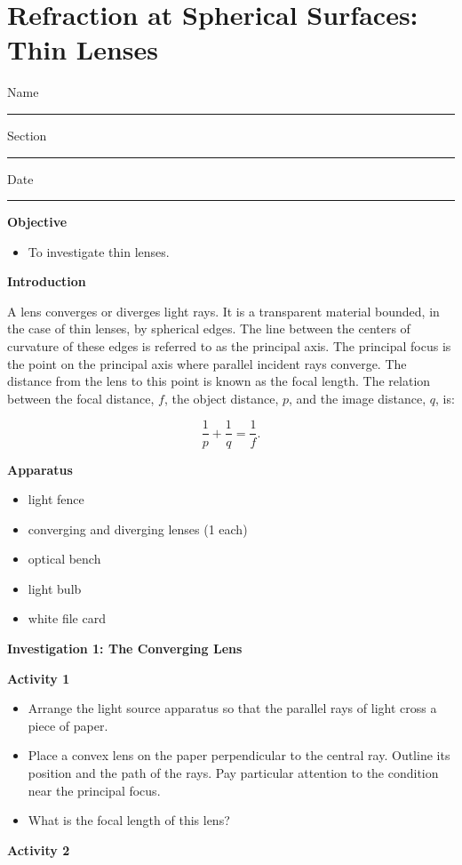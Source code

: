 
\section{Refraction at Spherical Surfaces: Thin Lenses}

Name \rule{2.0in}{0.1pt}\hfill{}Section \rule{1.0in}{0.1pt}\hfill{}Date
\rule{1.0in}{0.1pt}

\textbf{Objective}

\begin{itemize}
\item To investigate thin lenses.
\end{itemize}
\textbf{Introduction} 

A lens converges or diverges light rays. It is a transparent material
bounded, in the case of thin lenses, by spherical edges. The line
between the centers of curvature of these edges is referred to as
the principal axis. The principal focus is the point on the principal
axis where parallel incident rays converge. The distance from the
lens to this point is known as the focal length. The relation between
the focal distance, $f$, the object distance, $p$, and the image distance,
$q$, is:

\begin{displaymath} \frac{1}{p} + \frac{1}{q} = \frac{1}{f}. \end{displaymath}

\textbf{Apparatus}

\begin{itemize}
\item light fence 
\item converging and diverging lenses (1 each) 
\item optical bench 
\item light bulb 
\item white file card
\end{itemize}
\textbf{Investigation 1: The Converging Lens}

\textbf{Activity 1}

\begin{itemize}
\item Arrange the light source apparatus so that the parallel rays of light
cross a piece of paper. 
\item Place a convex lens on the paper perpendicular to the central ray.
Outline its position and the path of the rays. Pay particular attention
to the condition near the principal focus.
\item What is the focal length of this lens?\vspace{15mm}

\end{itemize}
\textbf{Activity 2 }


